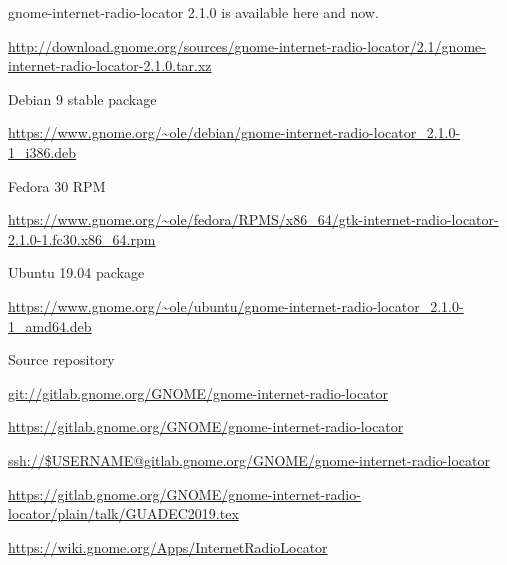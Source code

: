 \documentclass[20pt,landscape]{foils}
\begin{document}

\begin{list1}
\item gnome-internet-radio-locator 2.1.0 is available here and now.
  \begin{list2}
  \item \begin{tiny}\url{http://download.gnome.org/sources/gnome-internet-radio-locator/2.1/gnome-internet-radio-locator-2.1.0.tar.xz}\end{tiny}
  \end{list2}
\item Debian 9 stable package
  \begin{list2}
  \item \begin{tiny}\url{https://www.gnome.org/~ole/debian/gnome-internet-radio-locator_2.1.0-1_i386.deb}\end{tiny}
  \end{list2}
\item Fedora 30 RPM
  \begin{list2}
  \item \begin{tiny}\url{https://www.gnome.org/~ole/fedora/RPMS/x86_64/gtk-internet-radio-locator-2.1.0-1.fc30.x86_64.rpm}\end{tiny}
  \end{list2}
\item Ubuntu 19.04 package
  \begin{list2}
  \item \begin{tiny}\url{https://www.gnome.org/~ole/ubuntu/gnome-internet-radio-locator_2.1.0-1_amd64.deb}\end{tiny}
  \end{list2}
\item Source repository
  \begin{list2}
    \item \url{git://gitlab.gnome.org/GNOME/gnome-internet-radio-locator}
    \item \url{https://gitlab.gnome.org/GNOME/gnome-internet-radio-locator}
    \item \url{ssh://$USERNAME@gitlab.gnome.org/GNOME/gnome-internet-radio-locator}
  \end{list2}
\end{list1}


\url{https://gitlab.gnome.org/GNOME/gnome-internet-radio-locator/plain/talk/GUADEC2019.tex}


\url{https://wiki.gnome.org/Apps/InternetRadioLocator}
\end{document}
